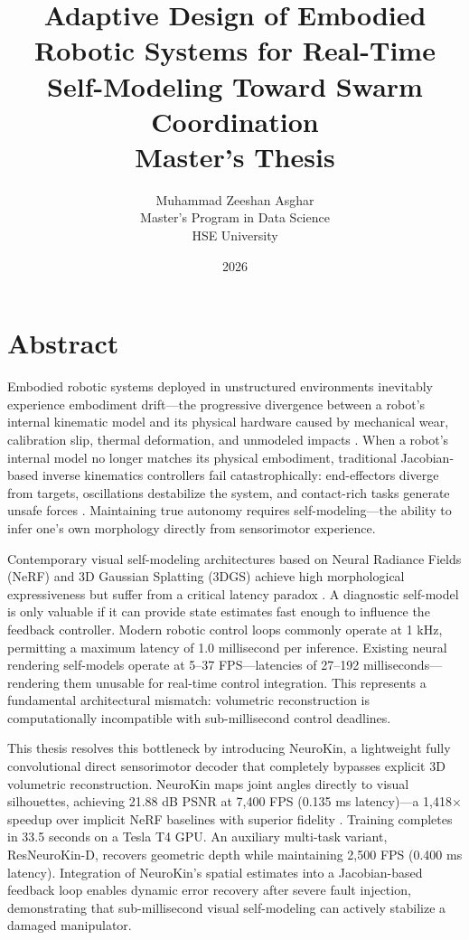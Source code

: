 ﻿\documentclass[12pt,a4paper,oneside]{report}
\title{
    \vspace{2cm}
    \textbf{\Large Adaptive Design of Embodied Robotic Systems for Real-Time Self-Modeling Toward Swarm Coordination} \\
    \vspace{1cm}
    \large Master's Thesis
}
\author{
    Muhammad Zeeshan Asghar \\
    Master's Program in Data Science \\
    HSE University
}
\date{\vspace{1cm} 2026}
\begin{document}
\maketitle
\clearpage

\chapter*{Abstract}

Embodied robotic systems deployed in unstructured environments inevitably experience embodiment drift---the progressive divergence between a robot's internal kinematic model and its physical hardware caused by mechanical wear, calibration slip, thermal deformation, and unmodeled impacts \cite{bongard2006resilient, cully2015robots}. When a robot's internal model no longer matches its physical embodiment, traditional Jacobian-based inverse kinematics controllers fail catastrophically: end-effectors diverge from targets, oscillations destabilize the system, and contact-rich tasks generate unsafe forces \cite{kwiatkowski2019task, chen2022full}. Maintaining true autonomy requires self-modeling---the ability to infer one's own morphology directly from sensorimotor experience.

Contemporary visual self-modeling architectures based on Neural Radiance Fields (NeRF) and 3D Gaussian Splatting (3DGS) achieve high morphological expressiveness but suffer from a critical latency paradox \cite{hu2024teaching, hu2025learning}. A diagnostic self-model is only valuable if it can provide state estimates fast enough to influence the feedback controller. Modern robotic control loops commonly operate at 1 kHz, permitting a maximum latency of 1.0 millisecond per inference. Existing neural rendering self-models operate at 5--37 FPS---latencies of 27--192 milliseconds---rendering them unusable for real-time control integration. This represents a fundamental architectural mismatch: volumetric reconstruction is computationally incompatible with sub-millisecond control deadlines.

This thesis resolves this bottleneck by introducing NeuroKin, a lightweight fully convolutional direct sensorimotor decoder that completely bypasses explicit 3D volumetric reconstruction. NeuroKin maps joint angles directly to visual silhouettes, achieving 21.88 dB PSNR at 7,400 FPS (0.135 ms latency)---a 1,418$\times$ speedup over implicit NeRF baselines with superior fidelity \cite{hu2024teaching}. Training completes in 33.5 seconds on a Tesla T4 GPU. An auxiliary multi-task variant, ResNeuroKin-D, recovers geometric depth while maintaining 2,500 FPS (0.400 ms latency). Integration of NeuroKin's spatial estimates into a Jacobian-based feedback loop enables dynamic error recovery after severe fault injection, demonstrating that sub-millisecond visual self-modeling can actively stabilize a damaged manipulator.
\end{document}

